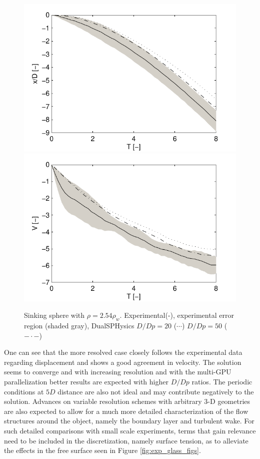 %
\begin{figure}[ht!]
	\centering
	\includegraphics[width=0.48\linewidth]{Figures/5.Chapter/Comp_curve_cut}
	\includegraphics[width=0.48\linewidth]{Figures/5.Chapter/Comp_curve_vel_smooth_cut}
	\caption{Sinking sphere with $\rho=2.54\rho_{w}$. Experimental(-), experimental error region (shaded gray), DualSPHysics $D/Dp=20$ ($\cdots$) $D/Dp=50$ ($- \cdot -$) }
	\label{fig:exp_glass} 
\end{figure}
%

One can see that the more resolved case closely follows the experimental data regarding displacement and shows a good agreement in velocity. 
The solution seems to converge and with increasing resolution and with the multi-GPU parallelization better results are expected with higher $D/Dp$ ratios. The periodic conditions at $5D$ distance are also not ideal and may contribute negatively to the solution. Advances on variable resolution schemes with arbitrary 3-D geometries \citep{Vacondio-2013} are also expected to allow for a much more detailed characterization of the flow structures around the object, namely the boundary layer and turbulent wake. For such detailed comparisons with small scale experiments, terms that gain relevance need to be included in the discretization, namely surface tension, as to alleviate the effects in the free surface seen in Figure \ref{fig:exp_glass_figs}.


